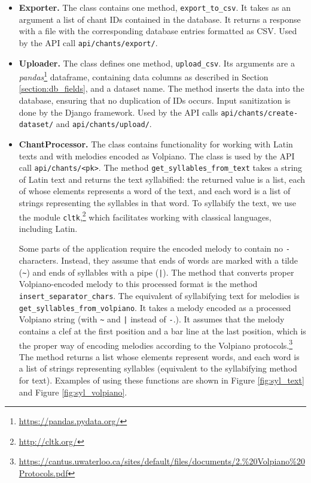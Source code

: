 \begin{itemize}

\item\textbf{Exporter.} The class contains one method, \verb|export_to_csv|. It takes as an argument a list of chant IDs contained in the database. It returns
a response with a file with the corresponding database entries formatted as CSV. Used by the API call \verb|api/chants/export/|.

\item\textbf{Uploader.} The class defines one method, \verb|upload_csv|. Its arguments are a \emph{pandas}\footnote{\url{https://pandas.pydata.org/}} dataframe, containing
data columns as described in Section \ref{section:db_fields}, and a dataset name. The method inserts the data into the database, ensuring that no duplication 
of IDs occurs. Input sanitization is done by the Django framework. Used by the API calls \verb|api/chants/create-dataset/| and \verb|api/chants/upload/|.

\item\textbf{ChantProcessor.} The class contains functionality for working with Latin texts and with melodies encoded as Volpiano. The class is used by the API call
\verb|api/chants/<pk>|. The method \verb|get_syllables_from_text|
takes a string of Latin text and returns the text syllabified: the returned value is a list, each of whose elements represents a word of the text, and each word
is a list of strings representing the syllables in that word. To syllabify the text, we use the module \verb|cltk|,\footnote{\url{http://cltk.org/}} which facilitates
working with classical languages, including Latin.

Some parts of the application require the encoded melody to contain no \verb|-| characters. Instead, they assume that ends of words are marked with a tilde (\verb|~|) and ends of
syllables with a pipe (\verb=|=). The method that converts proper Volpiano-encoded melody to this processed format is the method \verb|insert_separator_chars|.
The equivalent of syllabifying text for melodies is \verb|get_syllables_from_volpiano|. It takes a melody encoded as a processed Volpiano string (with \verb|~| and \verb=|=
instead of \verb|-|.). It assumes that the
melody contains a clef at the first position and a bar line at the last position, which is the proper way of encoding melodies according to the Volpiano
protocols.\footnote{\url{https://cantus.uwaterloo.ca/sites/default/files/documents/2.\%20Volpiano\%20Protocols.pdf}} The method returns a list whose elements represent words,
and each word is a list of strings representing syllables (equivalent to the syllabifying method for text). Examples of using these functions are shown in Figure \ref{fig:syl_text}
and Figure \ref{fig:syl_volpiano}.


\end{itemize}
